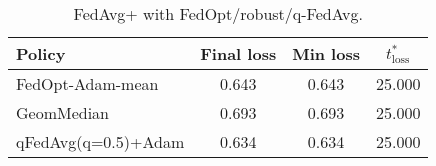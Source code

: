 \begin{table}[t]
\centering
\begin{tabular}{lccc}
\toprule
Policy & Final loss & Min loss & $t^*_{\text{loss}}$ \\
\midrule
FedOpt-Adam-mean & 0.643 & 0.643 & 25.000 \\
GeomMedian & 0.693 & 0.693 & 25.000 \\
qFedAvg(q=0.5)+Adam & 0.634 & 0.634 & 25.000 \\
\bottomrule
\end{tabular}
\caption{FedAvg+ with FedOpt/robust/q-FedAvg.}
\label{tab:fedavg_plus}
\end{table}
